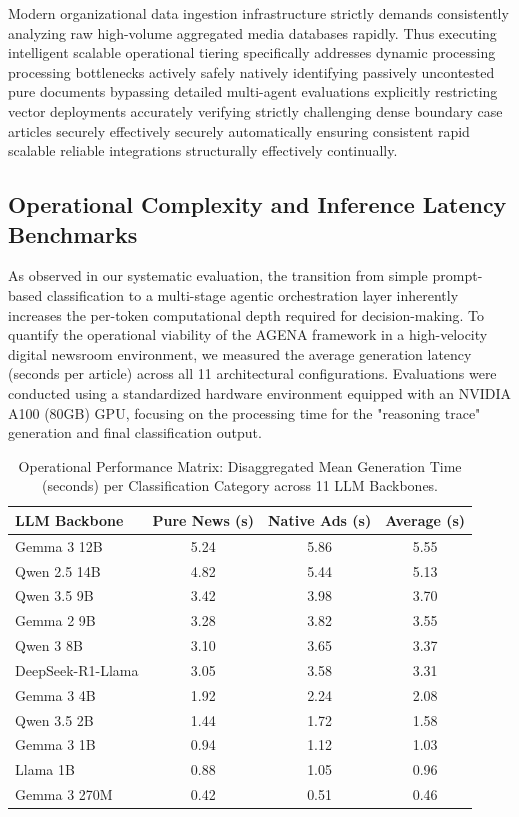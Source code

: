 \documentclass{ieeeaccess}
\begin{document}
Modern organizational data ingestion infrastructure strictly demands consistently analyzing raw high-volume aggregated media databases rapidly. Thus executing intelligent scalable operational tiering specifically addresses dynamic processing processing bottlenecks actively safely natively identifying passively uncontested pure documents bypassing detailed multi-agent evaluations explicitly restricting vector deployments accurately verifying strictly challenging dense boundary case articles securely effectively securely automatically ensuring consistent rapid scalable reliable integrations structurally effectively continually.



\subsection{Operational Complexity and Inference Latency Benchmarks}
As observed in our systematic evaluation, the transition from simple prompt-based classification to a multi-stage agentic orchestration layer inherently increases the per-token computational depth required for decision-making. To quantify the operational viability of the AGENA framework in a high-velocity digital newsroom environment, we measured the average generation latency (seconds per article) across all 11 architectural configurations. Evaluations were conducted using a standardized hardware environment equipped with an NVIDIA A100 (80GB) GPU, focusing on the processing time for the "reasoning trace" generation and final classification output.

\begin{table}[htbp]
\centering
\caption{Operational Performance Matrix: Disaggregated Mean Generation Time (seconds) per Classification Category across 11 LLM Backbones.}
\label{tab:generation_time}
\renewcommand{\arraystretch}{1.2}
\begin{tabular}{l c c c}
\toprule
\textbf{LLM Backbone} & \textbf{Pure News (s)} & \textbf{Native Ads (s)} & \textbf{Average (s)} \\
\midrule
Gemma 3 12B & 5.24 & 5.86 & 5.55 \\
Qwen 2.5 14B & 4.82 & 5.44 & 5.13 \\
Qwen 3.5 9B & 3.42 & 3.98 & 3.70 \\
Gemma 2 9B & 3.28 & 3.82 & 3.55 \\
Qwen 3 8B & 3.10 & 3.65 & 3.37 \\
DeepSeek-R1-Llama & 3.05 & 3.58 & 3.31 \\
Gemma 3 4B & 1.92 & 2.24 & 2.08 \\
Qwen 3.5 2B & 1.44 & 1.72 & 1.58 \\
Gemma 3 1B & 0.94 & 1.12 & 1.03 \\
Llama 1B & 0.88 & 1.05 & 0.96 \\
Gemma 3 270M & 0.42 & 0.51 & 0.46 \\
\bottomrule
\end{tabular}
\end{table}
\end{document}
